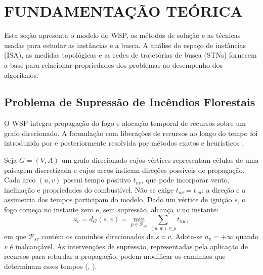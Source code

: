 \chapter{\MakeUppercase{Fundamentação Teórica}}\label{sec:fundamentacao}

Esta seção apresenta o modelo do WSP, os métodos de solução e as técnicas usadas para estudar as instâncias
e a busca. A análise do espaço de instâncias (ISA), as medidas topológicas
e as redes de trajetórias de busca (STNs) fornecem a base para relacionar
propriedades dos problemas ao desempenho dos algoritmos.

\section{Problema de Supressão de Incêndios Florestais}\label{sec:wsp}

O WSP integra propagação do fogo e alocação temporal de recursos sobre um
grafo direcionado. A formulação com liberações de recursos ao longo do tempo
foi introduzida por  e posteriormente resolvida por
métodos exatos e heurísticos
\cite{DelazeriRitt2024,HarrisForbesTaimre2023,MendesAlvelos2023}.

Seja $G=(V,A)$ um grafo direcionado cujos vértices representam células de uma paisagem
discretizada e cujos arcos indicam direções possíveis de propagação.
Cada arco $(u,v)$ possui tempo positivo $t_{uv}$, que pode incorporar
vento, inclinação e propriedades do combustível. Não se exige
$t_{uv}=t_{vu}$: a direção e a assimetria dos tempos participam do modelo.
Dado um vértice de ignição $s$, o fogo começa no instante zero e, sem
supressão, alcança $v$ no instante:
\begin{equation}
 a_v=d_G(s,v)=\min_{p\in\mathcal{P}_{sv}}\sum_{(u,w)\in p}t_{uw},
 \label{eq:tempo-chegada-livre}
\end{equation}
\noindent em que $\mathcal{P}_{sv}$ contém os caminhos direcionados de $s$
a $v$. Adota-se $a_v=+\infty$ quando $v$ é inalcançável. As intervenções de supressão, representadas pela aplicação de recursos
para retardar a propagação, podem modificar os caminhos que determinam esses tempos
(\citeauthor{DelazeriRitt2024}, \citeyear{DelazeriRitt2024,DelazeriRitt2026}).

